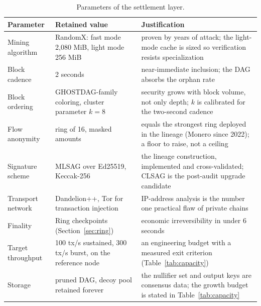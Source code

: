 \begin{table}[htbp]
\centering
\small
\caption{Parameters of the settlement layer.}
\label{tab:settlement}
\begin{tabularx}{\textwidth}{@{}L{4.0cm}L{4.6cm}Y@{}}
\toprule
Parameter & Retained value & Justification \\
\midrule
Mining algorithm & RandomX: fast mode 2,080 MiB, light mode 256 MiB & proven by years of attack; the light-mode cache is sized so verification resists specialization \\
Block cadence & 2 seconds & near-immediate inclusion; the DAG absorbs the orphan rate \\
Block ordering & GHOSTDAG-family coloring, cluster parameter $k = 8$ & security grows with block volume, not only depth; $k$ is calibrated for the two-second cadence \\
Flow anonymity & ring of 16, masked amounts & equals the strongest ring deployed in the lineage (Monero since 2022); a floor to raise, not a ceiling \\
Signature scheme & MLSAG over Ed25519, Keccak-256 & the lineage construction, implemented and cross-validated; CLSAG is the post-audit upgrade candidate \\
Transport network & Dandelion++, Tor for transaction injection & IP-address analysis is the number one practical flaw of private chains \\
Finality & Ring checkpoints (Section~\ref{sec:ring}) & economic irreversibility in under 6 seconds \\
Target throughput & 100 tx/s sustained, 300 tx/s burst, on the reference node & an engineering budget with a measured exit criterion (Table~\ref{tab:capacity}) \\
Storage & pruned DAG, decoy pool retained forever & the nullifier set and output keys are consensus data; the growth budget is stated in Table~\ref{tab:capacity} \\
\bottomrule
\end{tabularx}
\end{table}

